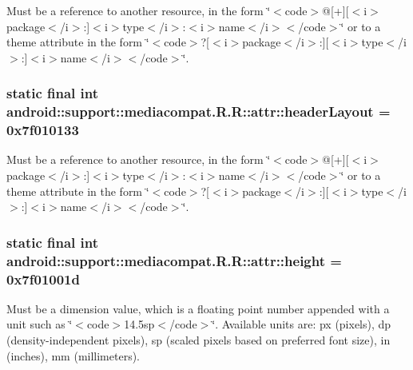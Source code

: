 Must be a reference to another resource, in the form \char`\"{}$<$code$>$@\mbox{[}+\mbox{]}\mbox{[}$<$i$>$package$<$/i$>$:\mbox{]}$<$i$>$type$<$/i$>$:$<$i$>$name$<$/i$>$$<$/code$>$\char`\"{} or to a theme attribute in the form \char`\"{}$<$code$>$?\mbox{[}$<$i$>$package$<$/i$>$:\mbox{]}\mbox{[}$<$i$>$type$<$/i$>$:\mbox{]}$<$i$>$name$<$/i$>$$<$/code$>$\char`\"{}. \hypertarget{classandroid_1_1support_1_1mediacompat_1_1_r_1_1attr_d6ea1a0c72ebc9ce782da13da9794211}{
\subsubsection[{headerLayout}]{\setlength{\rightskip}{0pt plus 5cm}static final int android::support::mediacompat.R.R::attr::headerLayout = 0x7f010133}}
\label{classandroid_1_1support_1_1mediacompat_1_1_r_1_1attr_d6ea1a0c72ebc9ce782da13da9794211}


Must be a reference to another resource, in the form \char`\"{}$<$code$>$@\mbox{[}+\mbox{]}\mbox{[}$<$i$>$package$<$/i$>$:\mbox{]}$<$i$>$type$<$/i$>$:$<$i$>$name$<$/i$>$$<$/code$>$\char`\"{} or to a theme attribute in the form \char`\"{}$<$code$>$?\mbox{[}$<$i$>$package$<$/i$>$:\mbox{]}\mbox{[}$<$i$>$type$<$/i$>$:\mbox{]}$<$i$>$name$<$/i$>$$<$/code$>$\char`\"{}. \hypertarget{classandroid_1_1support_1_1mediacompat_1_1_r_1_1attr_f16f5f895926e3a1228062e2d7a31fcf}{
\subsubsection[{height}]{\setlength{\rightskip}{0pt plus 5cm}static final int android::support::mediacompat.R.R::attr::height = 0x7f01001d}}
\label{classandroid_1_1support_1_1mediacompat_1_1_r_1_1attr_f16f5f895926e3a1228062e2d7a31fcf}


Must be a dimension value, which is a floating point number appended with a unit such as \char`\"{}$<$code$>$14.5sp$<$/code$>$\char`\"{}. Available units are: px (pixels), dp (density-independent pixels), sp (scaled pixels based on preferred font size), in (inches), mm (millimeters). 

